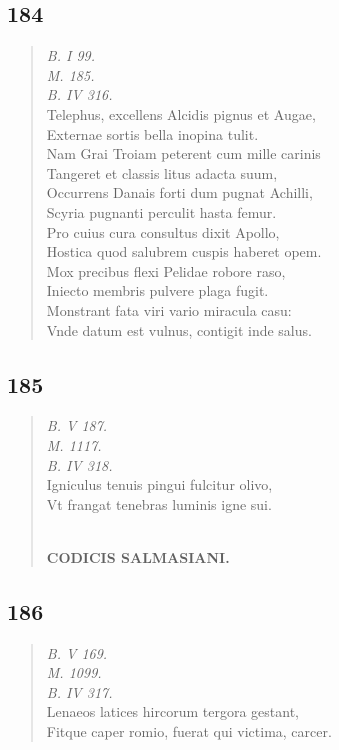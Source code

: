 \documentclass[11pt, a4paper]{report}
\begin{document}
            \subsection*{184}
      \begin{verse}
      \textit{B. I 99.} \\ \textit{M. 185.} \\ \textit{B. IV 316.} \\ Telephus, excellens Alcidis pignus et Augae, \\ Externae sortis bella inopina tulit. \\ Nam Grai Troiam peterent cum mille carinis \\ Tangeret et classis litus adacta suum, \\ Occurrens Danais forti dum pugnat Achilli, \\ Scyria pugnanti perculit hasta femur. \\ Pro cuius cura consultus dixit Apollo, \\ Hostica quod salubrem cuspis haberet opem. \\ Mox precibus flexi Pelidae robore raso, \\ Iniecto membris pulvere plaga fugit. \\ Monstrant fata viri vario miracula casu: \\ Vnde datum est vulnus, contigit inde salus. \\ 
      \end{verse}
  
            \subsection*{185}
      \begin{verse}
      \textit{B. V 187.} \\ \textit{M. 1117.} \\ \textit{B. IV 318.} \\ Igniculus tenuis pingui fulcitur olivo, \\ Vt frangat tenebras luminis igne sui. \\ 
        ﻿\pagebreak 
    \begin{center} \textbf{CODICIS SALMASIANI.} \end{center} \marginpar{[157]} 
      \end{verse}
  
            \subsection*{186}
      \begin{verse}
      \textit{B. V 169.} \\ \textit{M. 1099.} \\ \textit{B. IV 317.} \\ Lenaeos latices hircorum tergora gestant, \\ Fitque caper romio, fuerat qui victima, carcer. \\ 
      \end{verse}
  
\end{document}

